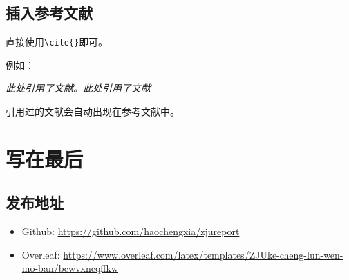 \documentclass[12pt,hyperref,a4paper,UTF8]{ctexart}
\begin{document}
%
%
%
%
%
%

\subsection{插入参考文献}
直接使用\verb|\cite{}|即可。

例如：


   \textit{ 此处引用了文献\cite{0Isaac}。此处引用了文献\cite{2016The}}


引用过的文献会自动出现在参考文献中。

\section{写在最后}
\subsection{发布地址}
\begin{itemize}
    \item Github: \url{https://github.com/haochengxia/zjureport}
    \item Overleaf:  \url{https://www.overleaf.com/latex/templates/ZJUke-cheng-lun-wen-mo-ban/bcwvxncqffkw}
\end{itemize}


\end{document}

